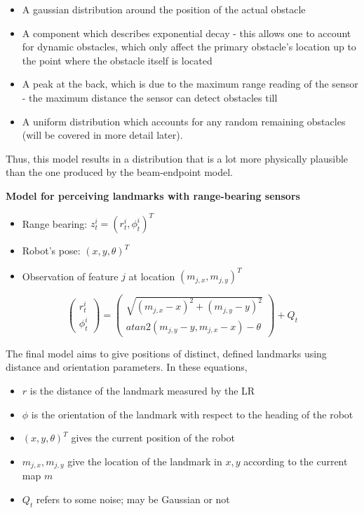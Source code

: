 \documentclass[a4paper]{article}
\begin{document}
\begin{itemize}
    \item A gaussian distribution around the position of the actual obstacle
    \item A component which describes exponential decay - this allows one to account for dynamic obstacles, which only affect the primary obstacle's location up to the point where the obstacle itself is located
    \item A peak at the back, which is due to the maximum range reading of the sensor - the maximum distance the sensor can detect obstacles till
    \item A uniform distribution which accounts for any random remaining obstacles (will be covered in more detail later).
\end{itemize}

Thus, this model results in a distribution that is a lot more physically plausible than the one produced by the beam-endpoint model.

\textbf{Model for perceiving landmarks with range-bearing sensors}

\begin{itemize}
    \item Range bearing: $z_t^i = (r_t^i, \phi _t^i)^T$
    \item Robot's pose: $(x,y,\theta)^T$
    \item Observation of feature $j$ at location $(m_{j,x}, m_{j,y})^T$
\end{itemize}

\begin{equation*}
    \begin{pmatrix}
        r_t^i \\ \phi_t^i
    \end{pmatrix}
    =
    \begin{pmatrix}
        \sqrt{(m_{j,x} - x)^2 + (m_{j,y} - y)^2}
        \\ atan2(m_{j,y} - y, m_{j,x} - x) - \theta
    \end{pmatrix}
    + Q_t
\end{equation*}

The final model aims to give positions of distinct, defined landmarks using distance and orientation parameters. In these equations,

\begin{itemize}
    \item $r$ is the distance of the landmark measured by the LR
    \item $\phi$ is the orientation of the landmark with respect to the heading of the robot
    \item $(x,y,\theta)^T$ gives the current position of the robot
    \item $m_{j,x}, m_{j,y}$ give the location of the landmark in $x,y$ according to the current map $m$
    \item $Q_t$ refers to some noise; may be Gaussian or not
\end{itemize}
\end{document}
